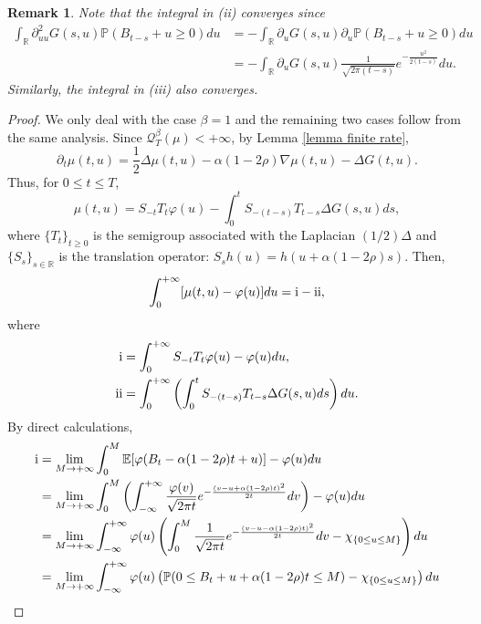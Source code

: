 \documentclass[reqno,11pt]{amsart}
\numberwithin{equation}{section}
\newtheorem{remark}[theorem]{Remark}
\newcommand{\R}{\mathbb{R}}
\begin{document}
\begin{remark}
	Note that the integral in (ii) converges since
	\begin{align*}
		\int_{\R}\partial_{uu}^2G (s,u)\mathbb{P}(B_{t-s}+u\geq 0)du&=-\int_{\R}\partial_{u}G (s,u)\partial_u\mathbb{P}(B_{t-s}+u\geq 0)du\\
		&=-\int_{\R}\partial_{u}G (s,u)\frac{1}{\sqrt{2\pi(t-s)}}e^{-\frac{u^2}{2(t-s)}}du.
	\end{align*}
	Similarly, the integral in (iii) also converges. 
\end{remark}


	\begin{proof}
		
		We only deal with the  case $\beta = 1$ and the remaining two cases follow from the same analysis. Since $\mathcal{Q}^\beta_T (\mu) < + \infty$, by Lemma \ref{lemma finite rate},
		\[
		\partial_t\mu(t,u)=\frac{1}{2}\Delta\mu(t, u)-\alpha(1-2\rho)\nabla\mu(t, u)-\Delta G (t,u).
		\]
		Thus, for $0\leq t\leq T$,
		\[
		\mu(t,u)=S_{-t}T_t \varphi (u)-\int_0^tS_{-(t-s)}T_{t-s}\Delta G (s,u)ds,
		\]
		where $\{T_t\}_{t\geq 0}$ is the semigroup associated with the Laplacian $(1/2) \Delta$ and $\{S_s\}_{s \in \R}$ is the translation operator: $S_s h (u) = h (u+\alpha(1-2\rho)s)$. Then, 
		\[
		\int_0^{+\infty} [\mu(t,u)- \varphi (u)]du={\rm \uppercase\expandafter{\romannumeral1}}-{\rm \uppercase\expandafter{\romannumeral2}},
		\]
		where
		\begin{align*}
			{\rm \uppercase\expandafter{\romannumeral1}} &=\int_0^{+\infty}S_{-t}T_t\varphi (u)-\varphi (u)du,\\
			{\rm \uppercase\expandafter{\romannumeral2}} &=\int_0^{+\infty}\left(\int_0^tS_{-(t-s)}T_{t-s}\Delta G(s,u)ds\right)du.
		\end{align*}
		By direct calculations,
		\begin{align}\label{equ appendix C1}
			{\rm \uppercase\expandafter{\romannumeral1}}&=\lim_{M\rightarrow+\infty}\int_0^M\mathbb{E} [\varphi (B_t-\alpha(1-2\rho)t+u)] -\varphi (u)du\notag\\
			&=\lim_{M\rightarrow+\infty}\int_0^M\left(\int_{-\infty}^{+\infty}\frac{\varphi (v)}{\sqrt{2\pi t}}e^{-\frac{(v-u+\alpha(1-2\rho)t)^2}{2t}}dv\right)-\varphi (u)du \notag\\
			&=\lim_{M\rightarrow+\infty}\int_{-\infty}^{+\infty}\varphi (u)\left(\int_0^M\frac{1}{\sqrt{2\pi t}}e^{-\frac{(v-u-\alpha(1-2\rho)t)^2}{2t}}dv-\chi_{\{0\leq u\leq M\}}\right)du \\
			&=\lim_{M\rightarrow+\infty}\int_{-\infty}^{+\infty}\varphi (u) \left(\mathbb{P}(0\leq B_t+u+\alpha(1-2\rho)t\leq M)-\chi_{\{0\leq u\leq M\}}\right)du \notag\\

\end{align}
\end{proof}
\end{document}
